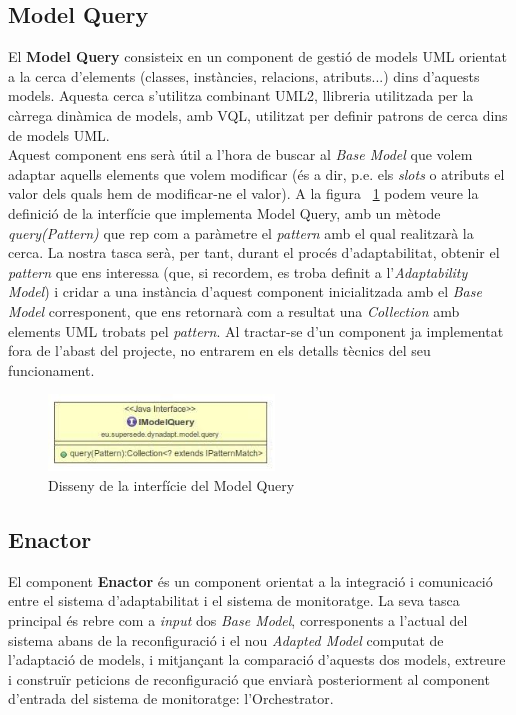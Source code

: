 \subsection{Model Query}

El \textbf{Model Query} consisteix en un component de gestió de models UML orientat a la cerca d'elements (classes, instàncies, relacions, atributs...) dins d'aquests models. Aquesta cerca s'utilitza combinant UML2, llibreria utilitzada per la càrrega dinàmica de models, amb VQL, utilitzat per definir patrons de cerca dins de models UML.\\

Aquest component ens serà útil a l'hora de buscar al \textit{Base Model} que volem adaptar aquells elements que volem modificar (és a dir, p.e. els \textit{slots} o atributs el valor dels quals hem de modificar-ne el valor). A la figura ~\ref{fig:Figura23} podem veure la definició de la interfície que implementa Model Query, amb un mètode \textit{query(Pattern)} que rep com a paràmetre el \textit{pattern} amb el qual realitzarà la cerca. La nostra tasca serà, per tant, durant el procés d'adaptabilitat, obtenir el \textit{pattern} que ens interessa (que, si recordem, es troba definit a l'\textit{Adaptability Model}) i cridar a una instància d'aquest component inicialitzada amb el \textit{Base Model} corresponent, que ens retornarà com a resultat una \textit{Collection} amb elements UML trobats pel \textit{pattern}. Al tractar-se d'un component ja implementat fora de l'abast del projecte, no entrarem en els detalls tècnics del seu funcionament.

\begin{figure}
\centering
\includegraphics[width=6cm]{Figures/Figure23}
\decoRule
\caption{Disseny de la interfície del Model Query}
\label{fig:Figura23}
\end{figure}

\subsection{Enactor}

El component \textbf{Enactor} és un component orientat a la integració i comunicació entre el sistema d'adaptabilitat i el sistema de monitoratge. La seva tasca principal és rebre com a \textit{input} dos \textit{Base Model}, corresponents a l'actual del sistema abans de la reconfiguració i el nou \textit{Adapted Model} computat de l'adaptació de models, i mitjançant la comparació d'aquests dos models, extreure i construïr peticions de reconfiguració que enviarà posteriorment al component d'entrada del sistema de monitoratge: l'Orchestrator.\\

